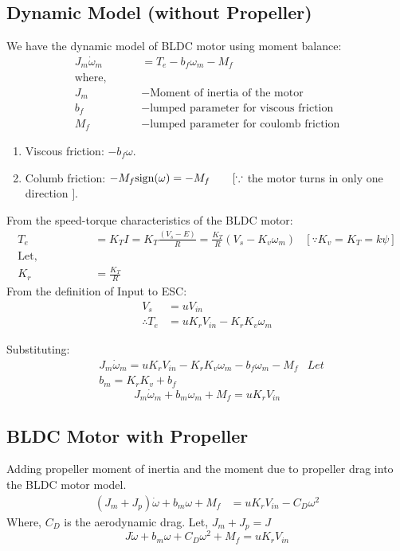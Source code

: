 \subsection{Dynamic Model (without Propeller)}
We have the dynamic model of BLDC motor using moment balance:
\begin{align*}
    J_m \dot \omega_m &= T_e - b_f \omega_m - M_f\\
    \text{where, } \qquad &\\
    J_m &- \text{Moment of inertia of the motor}\\
    b_f &- \text{lumped parameter for viscous friction}\\
    M_f &- \text{lumped parameter for coulomb friction}
\end{align*}
\begin{enumerate}
    \item Viscous friction: $-b_f \omega$.
    \item Columb friction: $-M_{f} \text{sign}(\omega) = -M_{f} \qquad [\because$ the motor turns in only one direction $]$.
\end{enumerate}

\medskip

From the speed-torque characteristics of the BLDC motor:
\begin{align*}
    T_e &= K_T I = K_T \frac{(V_s - E)}{R} = \frac{K_T}{R} (V_s - K_v \omega_m)  & [\because K_v = K_T = k \psi]\\
    \text{Let, }\qquad \qquad &\\
    K_r &= \frac{K_T}{R}
\end{align*}
From the definition of Input to ESC:
\begin{align*}
    V_s &= u V_{in}\\
    \therefore T_e &= u K_r V_{in} - K_r K_v \omega_m
\end{align*}

Substituting:
\begin{align*}
    &J_m \dot \omega_m = u K_r V_{in}  - K_rK_v \omega_m  - b_f \omega_m - M_f
    & Let \\
    & b_{m} = K_r K_v  + b_f
\end{align*}
\begin{equation}
    \boxed{
    J_m \dot \omega_m + b_m \omega_m + M_f = u K_r V_{in}
    }
    \label{eqn:no_prop}
\end{equation}

\subsection{BLDC Motor with Propeller}
Adding propeller moment of inertia and the moment due to propeller drag into the BLDC motor model.
\begin{align*}
    (J_m + J_p) \dot \omega + b_m \omega + M_f &= u K_r V_{in} - C_D \omega^2
\end{align*}
Where, $C_D$ is the aerodynamic drag. Let, $J_m + J_p = J$
\begin{equation}
    \boxed{
    J\dot \omega + b_m \omega + C_D \omega^2 + M_f = u K_r V_{in}
    }
    \label{eqn:prop}
\end{equation}
